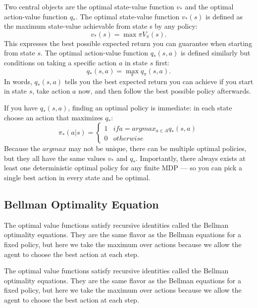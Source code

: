 Two central objects are the optimal state-value function $v_*$ and the optimal action-value function $q_*$.
The optimal state-value function $v_*(s)$ is defined as the maximum state-value achievable from state s by any policy:
\begin{equation*}
    v_*(s) = \max\pi V_\pi(s).    
\end{equation*}
This expresses the best possible expected return you can guarantee when starting from state $s$. The optimal action-value function $q_*(s,a)$ is defined similarly but conditions on taking a specific action $a$ in state $s$ first:
\begin{equation*}
q_*(s,a) = \max_\pi q_\pi(s,a).    
\end{equation*}
In words, $q_*(s,a)$ tells you the best expected return you can achieve if you start in state $s$, take action $a$ now, and then follow the best possible policy afterwards.

If you have $q_*(s,a)$, finding an optimal policy is immediate: in each state choose an action that maximizes $q_*$:
\begin{equation*}
    \pi_*(a|s) = 
    \begin{cases}
        1 & if a = argmax_{a \in A} q_*(s,a)\\
        0 & otherwise
    \end{cases}
\end{equation*}
Because the $argmax$ may not be unique, there can be multiple optimal policies, but they all have the same values $v_*$ and $q_*$. Importantly, there always exists at least one deterministic optimal policy for any finite MDP — so you can pick a single best action in every state and be optimal.

\subsection{Bellman Optimality Equation}
The optimal value functions satisfy recursive identities called the Bellman optimality equations. They are the same flavor as the Bellman equations for a fixed policy, but here we take the maximum over actions because we allow the agent to choose the best action at each step.

The optimal value functions satisfy recursive identities called the Bellman optimality equations. They are the same flavor as the Bellman equations for a fixed policy, but here we take the maximum over actions because we allow the agent to choose the best action at each step.

